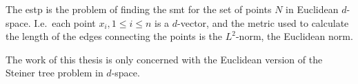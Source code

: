 The \gls{estp} is the problem of finding the \gls{smt} for the set of points $N$
in Euclidean $d$-space.  I.e.\ each point $x_{i}, 1 \le i \le n$ is a
$d$-vector, and the metric used to calculate the length of the edges connecting
the points is the $L^2$-norm, the Euclidean norm.

The work of this thesis is only concerned with the Euclidean version of the
Steiner tree problem in $d$-space.

\chapterbreak{}

